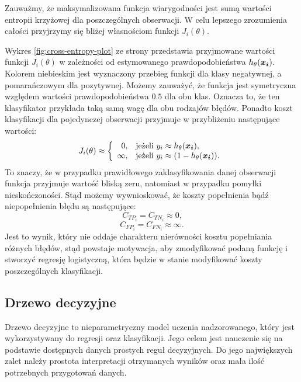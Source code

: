\documentclass[inzynierska]{pwr_wmat_praca_dyplomowa}
\theoremstyle{plain}
\numberwithin{theorem}{chapter}
\theoremstyle{definition}
\numberwithin{theorem}{chapter}
\begin{document}
Zauważmy, że maksymalizowana funkcja wiarygodności jest sumą wartości entropii krzyżowej dla poszczególnych obserwacji. W celu lepszego zrozumienia całości przyjrzymy się bliżej własnościom funkcji $J_i(\theta)$.

Wykres \ref{fig:cross-entropy-plot} ze strony \pageref{fig:cross-entropy-plot} przedstawia przyjmowane wartości funkcji $J_i(\theta)$ w zależności od estymowanego prawdopodobieństwa $h_{\theta}(\boldsymbol{x_i})$. Kolorem niebieskim jest wyznaczony przebieg funkcji dla klasy negatywnej, a pomarańczowym dla pozytywnej. Możemy zauważyć, że funkcja jest symetryczna względem wartości prawdopodobieństwa $0.5$ dla obu klas. Oznacza to, że ten klasyfikator przykłada taką samą wagę dla obu rodzajów błędów. Ponadto koszt klasyfikacji dla pojedynczej obserwacji przyjmuje w przybliżeniu następujące wartości:
$$
J_i(\theta) \approx \left\{
\begin{array}{rl}
0, &\mbox{jeżeli $y_i \approx h_{\theta}(\boldsymbol{x_i})$}, \\
\infty, &\mbox{jeżeli $y_i \approx (1 - h_{\theta}(\boldsymbol{x_i}))$}.
\end{array}{}
\right.
$$
To znaczy, że w przypadku prawidłowego zaklasyfikowania danej obserwacji funkcja przyjmuje wartość bliską zeru, natomiast w przypadku pomyłki nieskończoności. Stąd możemy wywnioskować, że koszty popełnienia bądź niepopełnienia błędu są następujące:
$$ C_{TP_i} = C_{TN_i} \approx 0 \text{,}$$
$$ C_{FP_i} = C_{FN_i} \approx \infty \text{.}$$
Jest to wynik, który nie oddaje charakteru nierówności kosztu popełniania różnych błędów, stąd powstaje motywacja, aby zmodyfikować podaną funkcję i stworzyć regresję logistyczną, która będzie w stanie modyfikować koszty poszczególnych klasyfikacji.

\subsection{Drzewo decyzyjne}
\label{drzewo}
Drzewo decyzyjne to nieparametryczny model uczenia nadzorowanego, który jest wykorzystywany do regresji oraz klasyfikacji. Jego celem jest nauczenie się na podstawie dostępnych danych prostych reguł decyzyjnych. Do jego największych zalet należy prostota interpretacji otrzymanych wyników oraz mała ilość potrzebnych przygotowań danych.
\end{document}
